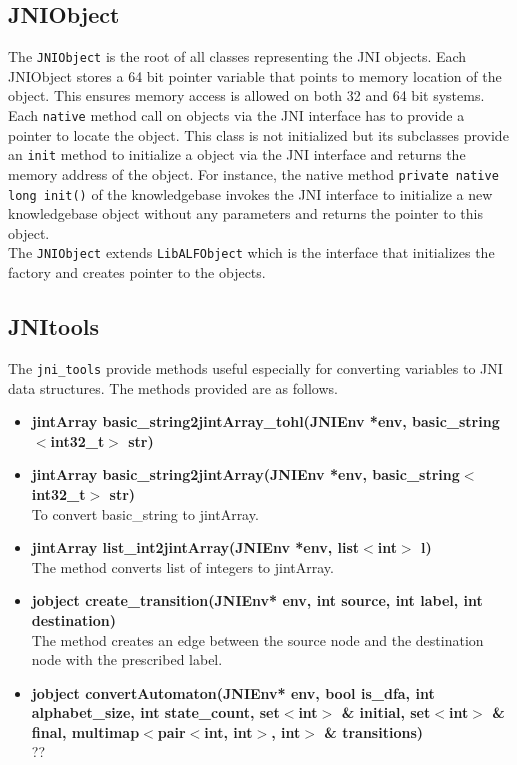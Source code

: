 \subsection*{JNIObject}
The \texttt{JNIObject} is the root of all classes representing the JNI \libalf \cpp objects. Each JNIObject stores a 64 bit pointer variable that points to memory location of the \cpp object. This ensures memory access is allowed on both 32 and 64 bit systems. Each \texttt{native} method call on \cpp objects via the JNI interface has to provide a pointer to locate the object. This class is not initialized but its subclasses provide an \texttt{init} method to initialize a \cpp object via the JNI interface and returns the memory address of the object. For instance, the native method \texttt{private native long init()} of the knowledgebase invokes the JNI interface to initialize a new \cpp knowledgebase object without any parameters and returns the pointer to this object. \\
The \texttt{JNIObject} extends \texttt{LibALFObject} which is the interface that initializes the factory and creates pointer to the \cpp objects. 
   
\subsection*{JNItools}
The \texttt{jni\_tools} provide methods useful especially for converting variables to JNI data structures. The methods provided are as follows.
\begin{itemize}
 \item \textbf{jintArray basic\_string2jintArray\_tohl(JNIEnv *env, basic\_string$<$int32\_t$>$ str)}
 \item \textbf{jintArray basic\_string2jintArray(JNIEnv *env, basic\_string$<$int32\_t$>$ str)} \\ 
	To convert basic\_string to jintArray. 
 \item \textbf{jintArray list\_int2jintArray(JNIEnv *env, list$<$int$>$ l)} \\
	The method converts list of integers to jintArray.
 \item \textbf{jobject create\_transition(JNIEnv* env, int source, int label, int destination)} \\
	The method creates an edge between the source node and the destination node with the prescribed label.
 \item \textbf{jobject convertAutomaton(JNIEnv* env, bool is\_dfa, int alphabet\_size, int state\_count, set$<$int$>$ \& initial, set$<$int$>$ \& final, multimap$<$pair$<$int, int$>$, int$>$ \& transitions)}\\ ??
\end{itemize}

